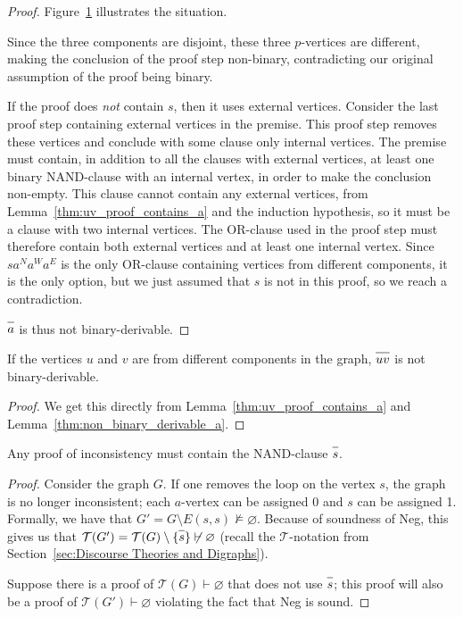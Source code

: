 \begin{proof}
  Figure~\ref{fig:proof_example_uv} illustrates the situation.\par
  \begin{figure}[!h]
    \centering
    \begin{prooftree}
    \end{prooftree}
    \caption{}
    \label{fig:proof_example_uv}
  \end{figure}
  Since the three components are disjoint, these three $p$-vertices are different, making the conclusion of the proof step non-binary, contradicting our original assumption of the proof being binary.

  If the proof does \textit{not} contain $s$, then it uses external vertices.
  Consider the last proof step containing external vertices in the premise.
  This proof step removes these vertices and conclude with some clause only internal vertices.
  The premise must contain, in addition to all the clauses with external vertices, at least one binary NAND-clause with an internal vertex, in order to make the conclusion non-empty.
  This clause cannot contain any external vertices, from Lemma~\ref{thm:uv_proof_contains_a} and the induction hypothesis, so it must be a clause with two internal vertices.
  The OR-clause used in the proof step must therefore contain both external vertices and at least one internal vertex.
  Since $sa^Na^Wa^E$ is the only OR-clause containing vertices from different components, it is the only option, but we just assumed that $s$ is not in this proof, so we reach a contradiction.

  $\ol{a}$ is thus not binary-derivable.
\end{proof}
\begin{corollary}
  If the vertices $u$ and $v$ are from different components in the graph, $\ol{uv}$ is not binary-derivable.
  \label{thm:non_binary_derivable_uv}
\end{corollary}
\begin{proof}
  We get this directly from Lemma~\ref{thm:uv_proof_contains_a} and Lemma~\ref{thm:non_binary_derivable_a}.
\end{proof}
\begin{lemma}
  Any proof of inconsistency must contain the NAND-clause $\ol{s}$.
  \label{thm:paradox_proof_use_s}
\end{lemma}
\begin{proof}
  Consider the graph $G$.
  If one removes the loop on the vertex $s$, the graph is no longer inconsistent;
  each $a$-vertex can be assigned 0 and $s$ can be assigned 1.
  Formally, we have that $G' = G \setminus E(s,s) \not\vDash \varnothing$.
  Because of soundness of Neg, this gives us that $\mathcal{T}(G') = \mathcal{T}(G) \setminus \{\ol{s} \} \not\vdash \varnothing$ (recall the $\mathcal{T}$-notation from Section~\ref{sec:Discourse Theories and Digraphs}).

  Suppose there is a proof of $\mathcal{T}(G)\vdash \varnothing$ that does not use $\ol{s}$;
  this proof will also be a proof of $\mathcal{T}(G')\vdash \varnothing$ violating the fact that Neg is sound.
\end{proof}
